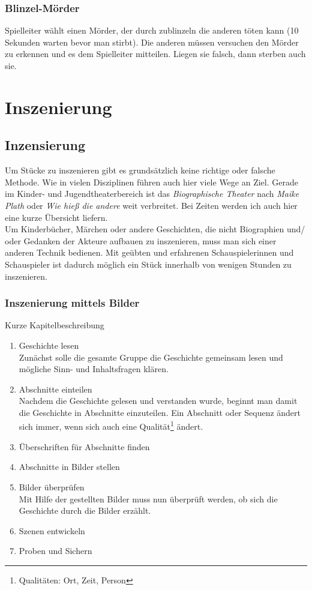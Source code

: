 \documentclass[ngerman, a4paper, twoside]{scrbook}%
\begin{document}
	\section{Blinzel-Mörder}
	Spielleiter wählt einen Mörder, der durch zublinzeln die anderen töten kann (10 Sekunden warten bevor man stirbt). Die anderen müssen versuchen den Mörder zu erkennen und es dem Spielleiter mitteilen. Liegen sie falsch, dann sterben auch sie.



	\setcounter{chapter}{0}
	\setcounter{section}{0}
	\part{Inszenierung}
	\chapter{Inzensierung}
	Um Stücke zu inszenieren gibt es grundsätzlich keine richtige oder falsche Methode. Wie in vielen Disziplinen führen auch hier viele Wege an Ziel. Gerade im Kinder- und Jugendtheaterbereich ist das \emph{Biographische Theater} nach \emph{Maike Plath} oder \emph{Wie hieß die andere} weit verbreitet. Bei Zeiten werden ich auch hier eine kurze Übersicht liefern. \\
	Um Kinderbücher, Märchen oder andere Geschichten, die nicht Biographien und/ oder Gedanken der Akteure aufbauen zu inszenieren, muss man sich einer anderen Technik bedienen. Mit geübten und erfahrenen Schauspielerinnen und Schauspieler ist dadurch möglich ein Stück innerhalb von wenigen Stunden zu inszenieren.

	\section{Inszenierung mittels Bilder}
	Kurze Kapitelbeschreibung

	\begin{enumerate}
		\item Geschichte lesen\\
			Zunächst solle die gesamte Gruppe die Geschichte gemeinsam lesen und mögliche Sinn- und Inhaltsfragen klären.
		\item Abschnitte einteilen\\
			Nachdem die Geschichte gelesen und verstanden wurde, beginnt man damit die Geschichte in Abschnitte einzuteilen. Ein Abschnitt oder Sequenz ändert sich immer, wenn sich auch eine Qualität\footnote{Qualitäten: Ort, Zeit, Person} ändert.
		\item Überschriften für Abschnitte finden
		\item Abschnitte in Bilder stellen
		\item Bilder überprüfen\\
			Mit Hilfe der gestellten Bilder muss nun überprüft werden, ob sich die Geschichte durch die Bilder erzählt.
		\item Szenen entwickeln
		\item Proben und Sichern
	\end{enumerate}
\end{document}
